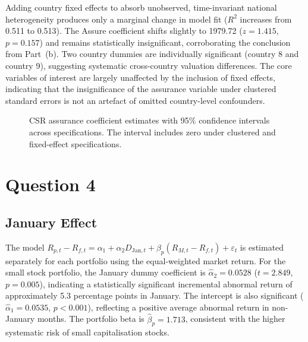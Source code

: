 \documentclass[11pt, a4paper]{article}
\begin{document}
\begin{table}[H]
	\centering
	
	\caption{Regression with country fixed effects and clustered standard errors.}\label{tab:q3c}
\end{table}

Adding country fixed effects to absorb unobserved, time-invariant national heterogeneity produces only a marginal change in model fit (\(R^2\) increases from 0.511 to 0.513). The Assure coefficient shifts slightly to 1979.72 (\(z = 1.415\), \(p = 0.157\)) and remains statistically insignificant, corroborating the conclusion from Part~(b). Two country dummies are individually significant (country 8 and country 9), suggesting systematic cross-country valuation differences. The core variables of interest are largely unaffected by the inclusion of fixed effects, indicating that the insignificance of the assurance variable under clustered standard errors is not an artefact of omitted country-level confounders.

\begin{figure}[H]
	\centering
	
	\caption{CSR assurance coefficient estimates with 95\% confidence intervals across specifications. The interval includes zero under clustered and fixed-effect specifications.}\label{fig:q3_coefs}
\end{figure}

\clearpage

\section{Question 4}

\subsection{January Effect}

\begin{table}[H]
	\centering
	
	\caption{January effect regression for small stocks.}\label{tab:q41_small}
\end{table}

\begin{table}[H]
	\centering
	
	\caption{January effect regression for large stocks.}\label{tab:q41_large}
\end{table}

The model \(R_{p,t} - R_{f,t} = \alpha_1 + \alpha_2 D_{\mathrm{Jan},t} + \beta_p(R_{M,t} - R_{f,t}) + \varepsilon_t\) is estimated separately for each portfolio using the equal-weighted market return. For the small stock portfolio, the January dummy coefficient is \(\hat{\alpha}_2 = 0.0528\) (\(t = 2.849\), \(p = 0.005\)), indicating a statistically significant incremental abnormal return of approximately 5.3 percentage points in January. The intercept is also significant (\(\hat{\alpha}_1 = 0.0535\), \(p < 0.001\)), reflecting a positive average abnormal return in non-January months. The portfolio beta is \(\hat{\beta}_p = 1.713\), consistent with the higher systematic risk of small capitalisation stocks.
\end{document}
